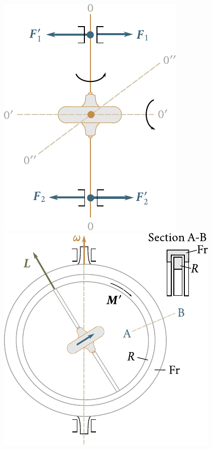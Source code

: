 \begin{figure}[t]
	\begin{minipage}[t]{0.45\linewidth}
		\begin{center}
			\includegraphics[scale=0.95]{figures/ch_05/fig_5_25.pdf}
			\caption[]{}
			\label{fig:5_25}
		\end{center}
	\end{minipage}
	\hspace{-0.05cm}
	\begin{minipage}[t]{0.55\linewidth}
		\begin{center}
			\includegraphics[scale=0.95]{figures/ch_05/fig_5_26.pdf}
			\caption[]{}
			\label{fig:5_26}
		\end{center}
	\end{minipage}
	\vspace{-0.65cm}
\end{figure}

